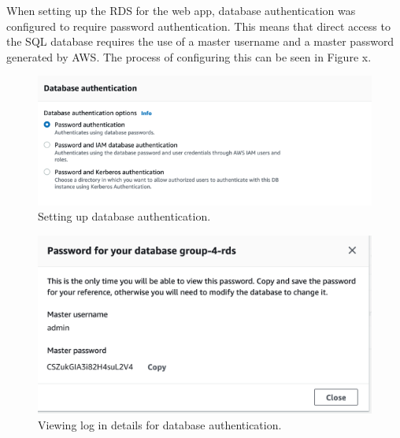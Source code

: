When setting up the RDS for the web app, database authentication was configured to require password authentication.
This means that direct access to the SQL database requires the use of a master username and a master password generated
by AWS.
The process of configuring this can be seen in Figure x.

\begin{figure}[!htbp]
    \centering
    \includegraphics[width=\textwidth]{resources/rds_authentication}
    \caption{Setting up database authentication.}
    \label{fig:setup-rds-auth}
\end{figure}

\begin{figure}[!htbp]
    \centering
    \includegraphics[width=\textwidth]{resources/RDS_password}
    \caption{Viewing log in details for database authentication.}
    \label{fig:view-rds-auth}
\end{figure}

%
%
%
%
%
%
